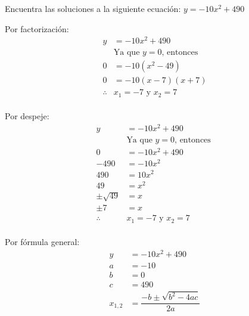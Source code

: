 Encuentra las soluciones a la siguiente ecuación:
$y=-10x^2+490$

\begin{solutionbox}{13cm}
    \begin{multicols}{2}
        Por factorización:
        \begin{align*}
            y          & = -10x^2+490                   \\
                       & \text{Ya que $y=0$, entonces } \\
            0          & = -10(x^2-49)                  \\
            0          & =-10(x-7)(x+7)                 \\
            \therefore & x_1 =-7 \text{ y } x_2 =7
        \end{align*}
        \\
        Por despeje:
        \begin{align*}
            y             & = -10x^2+490                   \\
                          & \text{Ya que $y=0$, entonces } \\
            0             & = -10x^2+490                   \\
            -490          & = -10x^2                       \\
            490           & = 10x^2                        \\
            49            & = x^2                          \\
            \pm \sqrt{49} & =         x                    \\
            \pm 7         & =         x                    \\
            \therefore    & x_1 =-7 \text{ y } x_2 =7
        \end{align*}
        \\
        Por fórmula general:
        \begin{align*}
            y          & = -10x^2+490                                                  \\
            a          & =-10                                                          \\
            b          & =0                                                            \\
            c          & =490                                                          \\
            x_{1,2}    & = \dfrac{-b\pm\sqrt{b^2-4ac}}{2a}                             \\[2em]

\end{align*}
\end{multicols}
\end{solutionbox}
